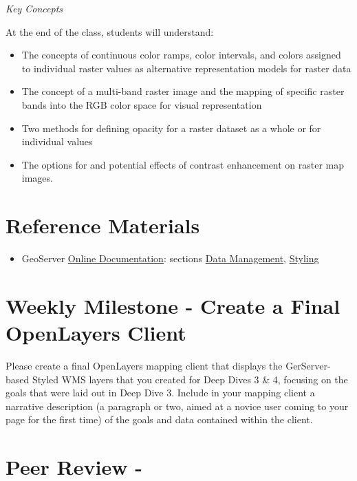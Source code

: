 \documentclass[]{book}
\providecommand{\tightlist}{%
  \setlength{\itemsep}{0pt}\setlength{\parskip}{0pt}}
\begin{document}
\emph{Key Concepts}

At the end of the class, students will understand:

\begin{itemize}
\tightlist
\item
  The concepts of continuous color ramps, color intervals, and colors
  assigned to individual raster values as alternative representation
  models for raster data
\item
  The concept of a multi-band raster image and the mapping of specific
  raster bands into the RGB color space for visual representation
\item
  Two methods for defining opacity for a raster dataset as a whole or
  for individual values
\item
  The options for and potential effects of contrast enhancement on
  raster map images.
\end{itemize}

\section{Reference Materials}\label{week15-reference}

\begin{itemize}
\tightlist
\item
  GeoServer
  \href{http://docs.geoserver.org/stable/en/user/index.html}{Online
  Documentation}: sections
  \href{http://docs.geoserver.org/latest/en/user/data/index.html\#data}{Data
  Management},
  \href{http://docs.geoserver.org/latest/en/user/styling/index.html\#styling}{Styling}
\end{itemize}

\section{Weekly Milestone - Create a Final OpenLayers
Client}\label{weekly-milestone---create-a-final-openlayers-client}

Please create a final OpenLayers mapping client that displays the
GerServer-based Styled WMS layers that you created for Deep Dives 3 \&
4, focusing on the goals that were laid out in Deep Dive 3. Include in
your mapping client a narrative description (a paragraph or two, aimed
at a novice user coming to your page for the first time) of the goals
and data contained within the client.

\section{Peer Review -}\label{week15-peerReview}
\end{document}
